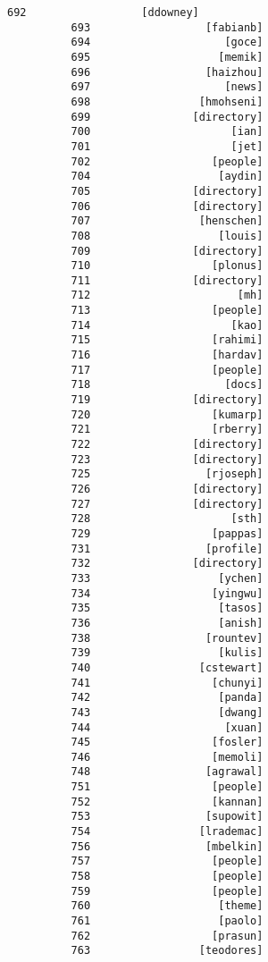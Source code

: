 \documentclass[11pt]{article}
\begin{document}
\begin{Verbatim}[commandchars=\\\{\}]
          692                  [ddowney]
          693                  [fabianb]
          694                     [goce]
          695                    [memik]
          696                  [haizhou]
          697                     [news]
          698                 [hmohseni]
          699                [directory]
          700                      [ian]
          701                      [jet]
          702                   [people]
          704                    [aydin]
          705                [directory]
          706                [directory]
          707                 [henschen]
          708                    [louis]
          709                [directory]
          710                   [plonus]
          711                [directory]
          712                       [mh]
          713                   [people]
          714                      [kao]
          715                   [rahimi]
          716                   [hardav]
          717                   [people]
          718                     [docs]
          719                [directory]
          720                   [kumarp]
          721                   [rberry]
          722                [directory]
          723                [directory]
          725                  [rjoseph]
          726                [directory]
          727                [directory]
          728                      [sth]
          729                   [pappas]
          731                  [profile]
          732                [directory]
          733                    [ychen]
          734                   [yingwu]
          735                    [tasos]
          736                    [anish]
          738                  [rountev]
          739                    [kulis]
          740                 [cstewart]
          741                   [chunyi]
          742                    [panda]
          743                    [dwang]
          744                     [xuan]
          745                   [fosler]
          746                   [memoli]
          748                  [agrawal]
          751                   [people]
          752                   [kannan]
          753                  [supowit]
          754                 [lrademac]
          756                  [mbelkin]
          757                   [people]
          758                   [people]
          759                   [people]
          760                    [theme]
          761                    [paolo]
          762                   [prasun]
          763                 [teodores]

\end{Verbatim}
\end{document}
